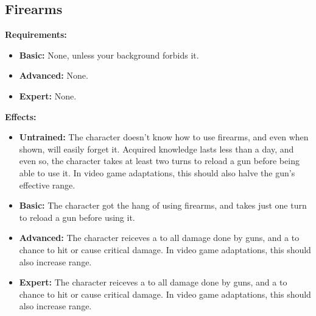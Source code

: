 \documentclass[openany,10pt,a4paper]{book}
\begin{document}
\subsection{Firearms}
\begin{table}[!ht]
\centering
{}
\end{table}
\textbf{Requirements:}
\begin{itemize}
	\item \textbf{Basic:} None, unless your background forbids it.
	\item \textbf{Advanced:} None.
	\item \textbf{Expert:} None.
\end{itemize}
\textbf{Effects:}
\begin{itemize}
	\item \textbf{Untrained:} The character doesn't know how to use firearms, and even when shown, will easily forget it. Acquired knowledge lasts less than a day, and even so, the character takes at least two turns to reload a gun before being able to use it. In video game adaptations, this should also halve the gun's effective range.
	\item \textbf{Basic:} The character got the hang of using firearms, and takes just one turn to reload a gun before using it. 
	\item \textbf{Advanced:} The character reiceves a  to all damage done by guns, and a  to chance to hit or cause critical damage. In video game adaptations, this should also increase range.
	\item \textbf{Expert:} The character reiceves a  to all damage done by guns, and a  to chance to hit or cause critical damage. In video game adaptations, this should also increase range.
\end{itemize}\newpage
\end{document}

